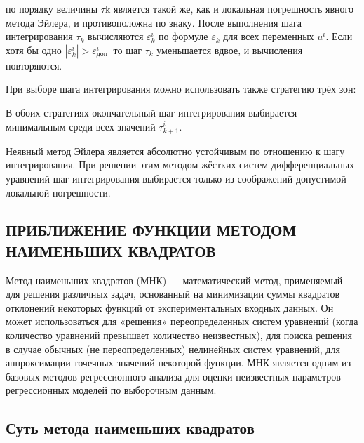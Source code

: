 \documentclass[a4paper]{article}
\begin{document}
{{{{{{{{%

по порядку величины $\tau \mathrm{k}$ является такой же, как и локальная погрешность явного метода Эйлера, и противоположна по знаку. После выполнения шага интегрирования $\tau_{k}$ вычисляются $\varepsilon_{k}^{i}$ по формуле $\varepsilon_{k}$ для всех переменных $u^{i}$. Если хотя бы одно $\left|\varepsilon_{k}^{i}\right|>\varepsilon_{\text {доп }}^{i}$ то шаг $\tau_{k}$ уменьшается вдвое, и вычисления повторяются.

При выборе шага интегрирования можно использовать также стратегию трёх зон:


В обоих стратегиях окончательный шаг интегрирования выбирается минимальным среди всех значений $\tau_{k+1}^{i}$.

Неявный метод Эйлера является абсолютно устойчивым по отношению к шагу интегрирования. При решении этим методом жёстких систем дифференциальных уравнений шаг интегрирования выбирается только из соображений допустимой локальной погрешности.

\newpage

\begin{center}
 \section{ПРИБЛИЖЕНИЕ ФУНКЦИИ МЕТОДОМ НАИМЕНЬШИХ КВАДРАТОВ}
\end{center}

Метод наименьших квадратов (МНК) — математический метод, применяемый для решения различных задач, основанный на минимизации суммы квадратов отклонений некоторых функций от экспериментальных входных данных. Он может использоваться для «решения» переопределенных систем уравнений (когда количество уравнений превышает количество неизвестных), для поиска решения в случае обычных (не переопределенных) нелинейных систем уравнений, для аппроксимации точечных значений некоторой функции. МНК является одним из базовых методов регрессионного анализа для оценки неизвестных параметров регрессионных моделей по выборочным данным.

\subsection{Суть метода наименьших квадратов}

}}}}}}}}
\end{document}
